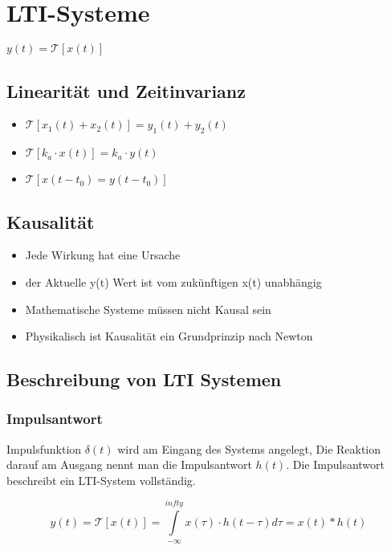 
\section{LTI-Systeme}

$ y(t) = \mathcal{T}[x(t)]$

\begin{multicols}{2}
    \subsection*{Linearität und Zeitinvarianz}
    \begin{itemize}
        \item $\mathcal{T}[x_1(t) + x_2(t)] = y_1(t) + y_2(t)$
        \item $\mathcal{T}[k_a \cdot x(t)] = k_a \cdot y(t)$
        \item $\mathcal{T}[x(t-t_0) = y(t-t_0)]$
    \end{itemize}

    \subsection*{Kausalität}
    \begin{itemize}
        \item Jede Wirkung hat eine Ursache
        \item der Aktuelle y(t) Wert ist vom zukünftigen x(t) unabhängig
        \item Mathematische Systeme müssen nicht Kausal sein
        \item Physikalisch ist Kausalität ein Grundprinzip nach Newton
    \end{itemize}

    \subsection{Beschreibung von LTI Systemen}

    \subsubsection{Impulsantwort}
    Impulsfunktion $\delta(t)$ wird am Eingang des Systems angelegt,
    Die Reaktion darauf am Ausgang nennt man die Impulsantwort $h(t)$.
    Die Impulsantwort beschreibt ein LTI-System vollständig.

    $$ y(t) = \mathcal{T}[x(t)]
        = \int \limits _{-\infty} ^{infty} x(\tau) \cdot h(t-\tau)d\tau
        = x(t) * h(t)$$


\end{multicols}
